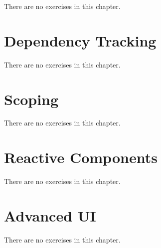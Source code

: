 \documentclass[]{book}
\begin{document}
There are no exercises in this chapter.

\hypertarget{dependency-tracking}{%
\chapter{Dependency Tracking}\label{dependency-tracking}}

There are no exercises in this chapter.

\hypertarget{scoping}{%
\chapter{Scoping}\label{scoping}}

There are no exercises in this chapter.

\hypertarget{reactive-components}{%
\chapter{Reactive Components}\label{reactive-components}}

There are no exercises in this chapter.

\hypertarget{advanced-ui}{%
\chapter{Advanced UI}\label{advanced-ui}}

There are no exercises in this chapter.


\end{document}
